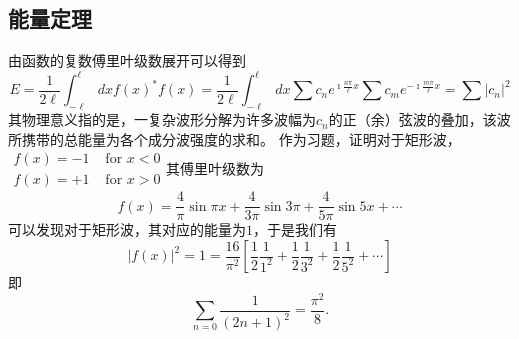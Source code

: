 \subsection{能量定理}
由函数的复数傅里叶级数展开可以得到
\begin{equation}
  E = \frac{1}{2\ell} \int_{-\ell}^{\ell} dx f(x)^* f(x) 
 = \frac{1}{2\ell} \int_{-\ell}^{\ell} dx  \sum c_n e^{\imath \frac{n\pi}{\ell} x} \sum c_m e^{-\imath \frac{m\pi}{\ell} x}
 = \sum |c_n|^2
\end{equation}
其物理意义指的是，一复杂波形分解为许多波幅为$c_n$的正（余）弦波的叠加，该波所携带的总能量为各个成分波强度的求和。
作为习题，证明对于矩形波，
$\begin{array}{ll}f(x)=-1 & \text { for } x<0 \\ f(x)=+1 & \text { for } x>0\end{array}$其傅里叶级数为
$$
f(x)=\frac{4}{\pi} \sin \pi x+\frac{4}{3 \pi} \sin 3 \pi+\frac{4}{5 \pi} \sin 5 x+\cdots
$$
可以发现对于矩形波，其对应的能量为$1$，于是我们有
$$
|f(x)|^2=1=\frac{16}{\pi^2}\left[\frac{1}{2} \frac{1}{1^2}+\frac{1}{2} \frac{1}{3^2}+\frac{1}{2} \frac{1}{5^2}+\cdots\right]
$$
即
\[
\sum_{n=0} \frac{1}{(2n+1)^2} = \frac{\pi^2}{8} .
\]